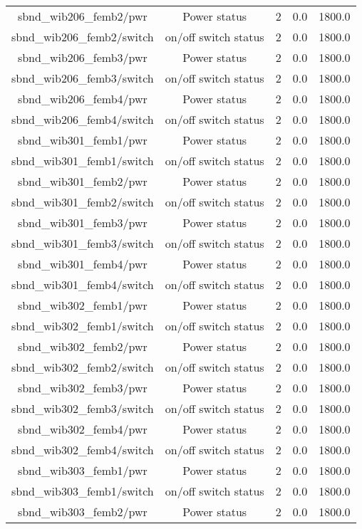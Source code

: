 \begin{center}
\begin{longtable}{c | c c c c }
sbnd\_wib206\_femb2/pwr & Power status & 2 & 0.0 & 1800.0\\ 
sbnd\_wib206\_femb2/switch & on/off switch status & 2 & 0.0 & 1800.0\\ 
sbnd\_wib206\_femb3/pwr & Power status & 2 & 0.0 & 1800.0\\ 
sbnd\_wib206\_femb3/switch & on/off switch status & 2 & 0.0 & 1800.0\\ 
sbnd\_wib206\_femb4/pwr & Power status & 2 & 0.0 & 1800.0\\ 
sbnd\_wib206\_femb4/switch & on/off switch status & 2 & 0.0 & 1800.0\\ 
sbnd\_wib301\_femb1/pwr & Power status & 2 & 0.0 & 1800.0\\ 
sbnd\_wib301\_femb1/switch & on/off switch status & 2 & 0.0 & 1800.0\\ 
sbnd\_wib301\_femb2/pwr & Power status & 2 & 0.0 & 1800.0\\ 
sbnd\_wib301\_femb2/switch & on/off switch status & 2 & 0.0 & 1800.0\\ 
sbnd\_wib301\_femb3/pwr & Power status & 2 & 0.0 & 1800.0\\ 
sbnd\_wib301\_femb3/switch & on/off switch status & 2 & 0.0 & 1800.0\\ 
sbnd\_wib301\_femb4/pwr & Power status & 2 & 0.0 & 1800.0\\ 
sbnd\_wib301\_femb4/switch & on/off switch status & 2 & 0.0 & 1800.0\\ 
sbnd\_wib302\_femb1/pwr & Power status & 2 & 0.0 & 1800.0\\ 
sbnd\_wib302\_femb1/switch & on/off switch status & 2 & 0.0 & 1800.0\\ 
sbnd\_wib302\_femb2/pwr & Power status & 2 & 0.0 & 1800.0\\ 
sbnd\_wib302\_femb2/switch & on/off switch status & 2 & 0.0 & 1800.0\\ 
sbnd\_wib302\_femb3/pwr & Power status & 2 & 0.0 & 1800.0\\ 
sbnd\_wib302\_femb3/switch & on/off switch status & 2 & 0.0 & 1800.0\\ 
sbnd\_wib302\_femb4/pwr & Power status & 2 & 0.0 & 1800.0\\ 
sbnd\_wib302\_femb4/switch & on/off switch status & 2 & 0.0 & 1800.0\\ 
sbnd\_wib303\_femb1/pwr & Power status & 2 & 0.0 & 1800.0\\ 
sbnd\_wib303\_femb1/switch & on/off switch status & 2 & 0.0 & 1800.0\\ 
sbnd\_wib303\_femb2/pwr & Power status & 2 & 0.0 & 1800.0\\ 

\end{longtable}
\end{center}
